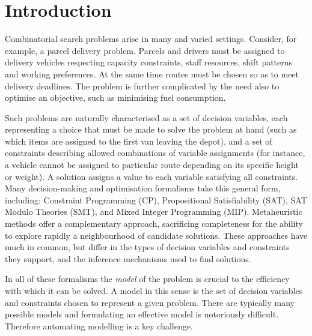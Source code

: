 \documentclass[runningheads]{llncs}
\begin{document}

\section{Introduction}

Combinatorial search problems arise in many and varied settings. Consider, for example, a parcel delivery problem. Parcels and drivers must be assigned to delivery vehicles respecting capacity constraints, staff resources, shift patterns and working preferences. At the same time routes must be chosen so as to meet delivery deadlines. The problem is further complicated by the need also to optimise an objective, such as minimising fuel consumption.

Such problems are naturally characterised as a set of decision variables, each representing a choice that must be made to solve the problem at hand (such as which items are assigned to the first van leaving the depot), and a set of constraints describing allowed combinations of variable assignments (for instance, a vehicle cannot be assigned to particular route depending on its specific height or weight). A solution assigns a value to each variable satisfying all constraints. Many decision-making and optimisation formalisms take this general form, including: Constraint Programming (CP), Propositional Satisfiability (SAT), SAT Modulo Theories (SMT), and Mixed Integer Programming (MIP). Metaheuristic methods offer a complementary approach, sacrificing completeness for the ability to explore rapidly a neighbourhood of candidate solutions. These approaches have much in common, but differ in the types of decision variables and constraints they support, and the inference mechanisms used to find solutions.

In all of these formalisms the {\em model} of the problem is crucial to the efficiency with which it can be solved. A model in this sense is the set of decision variables and constraints chosen to represent a given problem. There are typically many possible models and formulating an effective model is notoriously difficult. Therefore automating modelling is a key challenge. 
\end{document}
